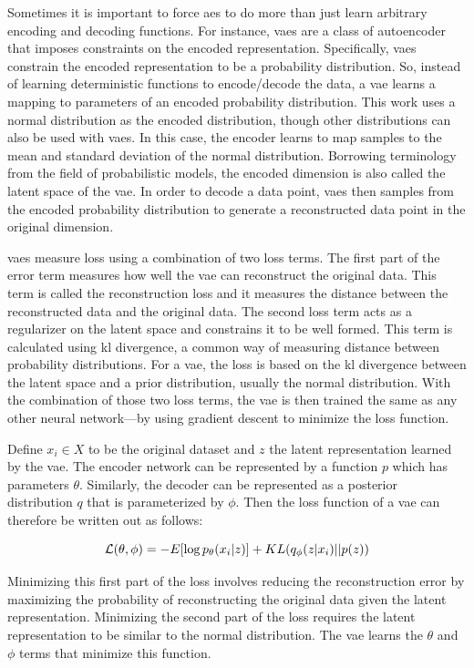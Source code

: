 Sometimes it is important to force \glspl{ae} to do more than just learn arbitrary encoding and decoding functions.
For instance, \glspl{vae} are a class of autoencoder that imposes constraints on the encoded representation.
Specifically, \glspl{vae} constrain the encoded representation to be a probability distribution.
So, instead of learning deterministic functions to encode/decode the data, a \gls{vae} learns a mapping to parameters of an encoded probability distribution.
This work uses a normal distribution as the encoded distribution, though other distributions can also be used with \glspl{vae}.
In this case, the encoder learns to map samples to the mean and standard deviation of the normal distribution.
Borrowing terminology from the field of probabilistic models, the encoded dimension is also called the latent space of the \gls{vae}.
In order to decode a data point, \glspl{vae} then samples from the encoded probability distribution to generate a reconstructed data point in the original dimension.

\glspl{vae} measure loss using a combination of two loss terms.
The first part of the error term measures how well the \gls{vae} can reconstruct the original data.
This term is called the reconstruction loss and it measures the distance between the reconstructed data and the original data.
The second loss term acts as a regularizer on the latent space and constrains it to be well formed.
This term is calculated using \gls{kl} divergence, a common way of measuring distance between probability distributions.
For a \gls{vae}, the loss is based on the \gls{kl} divergence between the latent space and a prior distribution, usually the normal distribution. 
With the combination of those two loss terms, the \gls{vae} is then trained the same as any other neural network---by using gradient descent to minimize the loss function.

Define $x_i \in X$ to be the original dataset and $z$ the latent representation learned by the \gls{vae}.
The encoder network can be represented by a function $p$ which has parameters $\theta$.
Similarly, the decoder can be represented as a posterior distribution $q$ that is parameterized by $\phi$.
Then the loss function of a \gls{vae} can therefore be written out as follows:

\begin{equation}\label{eqn:vae-loss}
\mathcal{L}(\theta, \phi) = - E[\log p_{\theta}(x_i | z)] + KL(q_{\phi}(z | x_i) || p(z)) \\
\end{equation}

Minimizing this first part of the loss involves reducing the reconstruction error by maximizing the probability of reconstructing the original data given the latent representation.
Minimizing the second part of the loss requires the latent representation to be similar to the normal distribution.
The \gls{vae} learns the $\theta$ and $\phi$ terms that minimize this function.